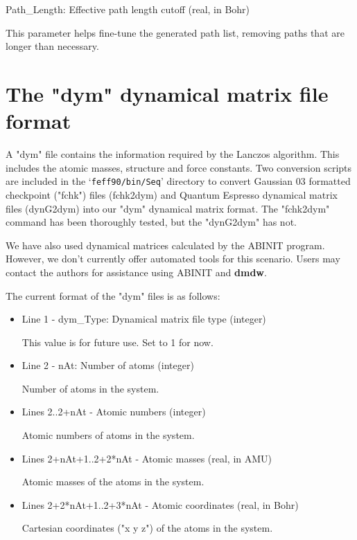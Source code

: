 \documentclass[11pt,oneside]{report} %
\newcommand{\file}[1]{`\texttt{#1}'}
\newcommand{\module}[1]{\textrm{\bf{#1}}}
\begin{document}
\begin{latexonly}
\begin{itemize}
    Path\_Length: Effective path length cutoff (real, in Bohr)
    
		This parameter helps fine-tune the generated path list, removing
		paths that are longer than necessary.
\end{itemize}



 \section{The "dym" dynamical matrix file format}

  A "dym" file contains the information required by the Lanczos algorithm. This
  includes the atomic masses, structure and force constants. Two conversion
  scripts are included in the \file{feff90/bin/Seq} directory to convert Gaussian 03 formatted
  checkpoint ("fchk") files (fchk2dym) and Quantum Espresso dynamical matrix
  files (dynG2dym) into our "dym" dynamical matrix format. The "fchk2dym"
  command has been thoroughly tested, but the "dynG2dym" has not. 
  
  We have also used dynamical matrices calculated by the ABINIT program.  However, we don't currently offer
  automated tools for this scenario.  Users may contact the authors for assistance using ABINIT and \module{dmdw}.
  
  The current format of the "dym" files is as follows:
\begin{itemize}
\item Line 1 - dym\_Type: Dynamical matrix file type (integer)

  This value is for future use. Set to 1 for now.

\item Line 2 - nAt: Number of atoms (integer)

  Number of atoms in the system.
  
\item Lines 2..2+nAt - Atomic numbers (integer)

  Atomic numbers of atoms in the system.

\item Lines 2+nAt+1..2+2*nAt - Atomic masses (real, in AMU)

  Atomic masses of the atoms in the system.

\item Lines 2+2*nAt+1..2+3*nAt - Atomic coordinates (real, in Bohr)

  Cartesian coordinates ("x y z") of the atoms in the system.


\end{itemize}
\end{latexonly}
\end{document}
